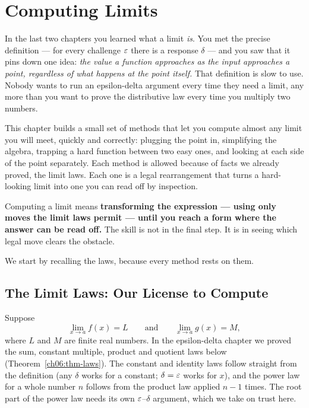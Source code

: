 \chapter{Computing Limits}

In the last two chapters you learned what a limit \emph{is}. You met the
precise definition --- for every challenge $\varepsilon$ there is a
response $\delta$ --- and you saw that it pins down one idea:
\emph{the value a function approaches as the input approaches a
point, regardless of what happens at the point itself.} That definition is
slow to use. Nobody wants to run an epsilon-delta argument
every time they need a limit, any more than you want to prove the
distributive law every time you multiply two numbers.

This chapter builds a small set of methods that let you compute almost any
limit you will meet, quickly and correctly: plugging the point in, simplifying
the algebra, trapping a hard function between two easy ones, and looking at
each side of the point separately. Each method is allowed because of facts we
already proved, the limit laws. Each one is a legal rearrangement that turns a
hard-looking limit into one you can read off by inspection.

\begin{focusbox}
Computing a limit means \textbf{transforming the expression --- using only
moves the limit laws permit --- until you reach a form where the answer can be
read off.} The skill is not in the final step. It is in seeing which legal move
clears the obstacle.
\end{focusbox}

We start by recalling the laws, because every method rests on them.

\section{The Limit Laws: Our License to Compute}
\label{ch07:laws}

Suppose
\[
  \lim_{x\to a} f(x) = L
  \qquad\text{and}\qquad
  \lim_{x\to a} g(x) = M,
\]
where $L$ and $M$ are finite real
numbers. In the epsilon-delta chapter we proved the sum, constant multiple,
product and quotient laws below (Theorem~\ref{ch06:thm-laws}). The constant and
identity laws follow straight from the definition (any $\delta$ works for a
constant; $\delta = \varepsilon$ works for $x$), and the power law for a whole number
$n$ follows from the product law applied $n-1$ times. The root part of the power
law needs its own $\varepsilon$--$\delta$ argument, which we take on trust here.

